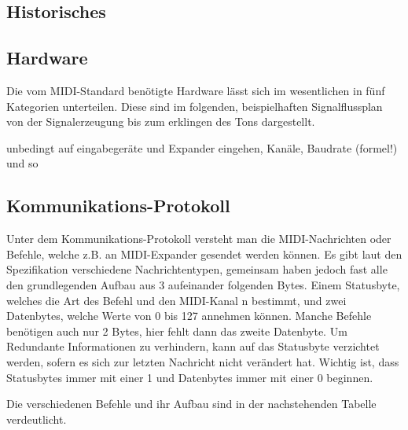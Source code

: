 \subsection{Historisches}

\subsection{Hardware}

Die vom MIDI-Standard benötigte Hardware lässt sich im wesentlichen in fünf Kategorien unterteilen. Diese sind im folgenden, beispielhaften Signalflussplan von der Signalerzeugung bis zum erklingen des Tons dargestellt.



unbedingt auf eingabegeräte und Expander eingehen, Kanäle, Baudrate (formel!) und so

\subsection{Kommunikations-Protokoll}
Unter dem Kommunikations-Protokoll versteht man die MIDI-Nachrichten oder Befehle, welche z.B. an MIDI-Expander gesendet werden können. Es gibt laut den Spezifikation verschiedene Nachrichtentypen, gemeinsam haben jedoch fast alle den grundlegenden Aufbau aus 3 aufeinander folgenden Bytes. Einem Statusbyte, welches die Art des Befehl und den MIDI-Kanal n bestimmt, und zwei Datenbytes, welche Werte von 0 bis 127 annehmen können. Manche Befehle benötigen auch nur 2 Bytes, hier fehlt dann das zweite Datenbyte. Um Redundante Informationen zu verhindern, kann auf das Statusbyte verzichtet werden, sofern es sich zur letzten Nachricht nicht verändert hat. Wichtig ist, dass Statusbytes immer mit einer 1 und Datenbytes immer mit einer 0 beginnen.

Die verschiedenen Befehle und ihr Aufbau sind in der nachstehenden Tabelle verdeutlicht.


